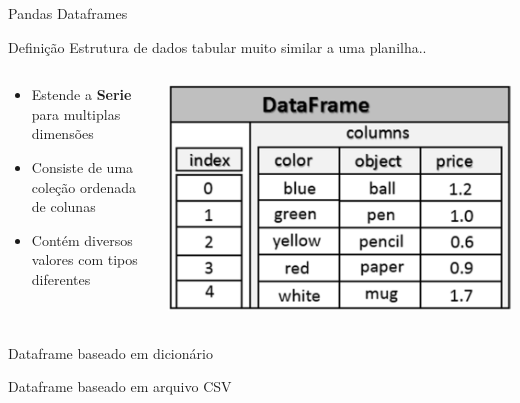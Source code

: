 \begin{frame}[t, fragile]{Pandas Dataframes}
  \begin{block}{Definição}
    Estrutura de dados tabular muito similar a uma planilha..
  \end{block}
  \begin{columns}
    \begin{column}{0.5\textwidth}
        \begin{itemize}
          \item Estende a {\bf Serie} para multiplas dimensões
          \item Consiste de uma coleção ordenada de colunas
          \item Contém diversos valores com tipos diferentes
        \end{itemize}
    \end{column}

    \begin{column}{0.5\textwidth}
      \begin{center}
        \includegraphics[scale=.21]{aula-2/figuras/pandas-dataframes-1.png}
      \end{center}
    \end{column}
  \end{columns}
\end{frame}
%
\begin{frame}{Dataframe baseado em dicionário}
    
\end{frame}
%
\begin{frame}{Dataframe baseado em arquivo CSV}
    
\end{frame}

